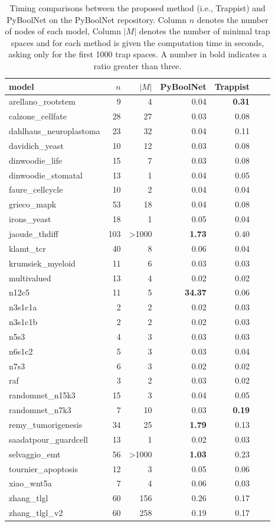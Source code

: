 \documentclass[runningheads]{llncs}
\begin{document}
\begin{table}[!htb]
  \caption{Timing comparisons between the proposed method (i.e., Trappist) and PyBoolNet on the PyBoolNet repository.
    Column \(n\) denotes the number of nodes of each model, Column \(|M|\) denotes the number of minimal trap spaces and for each method is given the computation time in seconds, asking only for the first 1000 trap spaces.
    A number in bold indicates a ratio greater than three.}
  \centering%
  \label{tab:pyboolnet_repo}
  \begin{tabular}{lrrrrrr}
    \toprule
    model & $n$ & $|M|$ & PyBoolNet & Trappist \\ \midrule
    arellano\_rootstem & 9 & 4 & 0.04 & \textbf{0.31}\\
    calzone\_cellfate & 28 & 27 & 0.03 & 0.08\\
    dahlhaus\_neuroplastoma & 23 & 32 & 0.04 & 0.11\\
    davidich\_yeast & 10 & 12 & 0.03 & 0.08\\
    dinwoodie\_life & 15 & 7 & 0.03 & 0.08\\
    dinwoodie\_stomatal & 13 & 1 & 0.04 & 0.05\\
    faure\_cellcycle & 10 & 2 & 0.04 & 0.04\\
    grieco\_mapk & 53 & 18 & 0.04 & 0.08\\
    irons\_yeast & 18 & 1 & 0.05 & 0.04\\
    jaoude\_thdiff & 103 & >1000 & \textbf{1.73} & 0.40\\
    klamt\_tcr & 40 & 8 & 0.06 & 0.04\\
    krumsiek\_myeloid & 11 & 6 & 0.03 & 0.03\\
    multivalued & 13 & 4 & 0.02 & 0.02\\
    n12c5 & 11 & 5 & \textbf{34.37} & 0.06\\
    n3s1c1a & 2 & 2 & 0.02 & 0.03\\
    n3s1c1b & 2 & 2 & 0.02 & 0.03\\
    n5s3 & 4 & 3 & 0.03 & 0.03\\
    n6s1c2 & 5 & 3 & 0.03 & 0.04\\
    n7s3 & 6 & 3 & 0.02 & 0.02\\
    raf & 3 & 2 & 0.03 & 0.02\\
    randomnet\_n15k3 & 15 & 3 & 0.04 & 0.05\\
    randomnet\_n7k3 & 7 & 10 & 0.03 & \textbf{0.19}\\
    remy\_tumorigenesis & 34 & 25 & \textbf{1.79} & 0.13\\
    saadatpour\_guardcell & 13 & 1 & 0.02 & 0.03\\
    selvaggio\_emt & 56 & >1000 & \textbf{1.03} & 0.23\\
    tournier\_apoptosis & 12 & 3 & 0.05 & 0.06\\
    xiao\_wnt5a & 7 & 4 & 0.06 & 0.03\\
    zhang\_tlgl & 60 & 156 & 0.26 & 0.17\\
    zhang\_tlgl\_v2 & 60 & 258 & 0.19 & 0.17\\
    \bottomrule
  \end{tabular}
\end{table}
\end{document}
